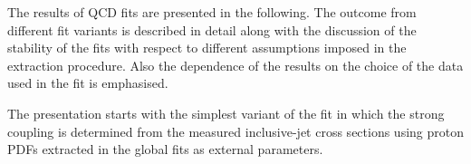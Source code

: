 The results of QCD fits are presented in the following. The outcome from different fit variants is described in detail along with the discussion of the stability of the fits with respect to different assumptions imposed in the \asz extraction procedure. Also the dependence of the results on the choice of the data used in the fit is emphasised.

The presentation starts with the simplest variant of the fit in which the strong coupling \asz is determined from the measured inclusive-jet cross sections using proton PDFs extracted in the global fits as external parameters.